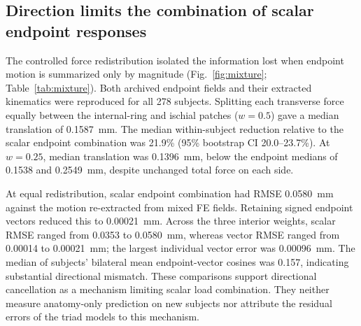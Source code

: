 \subsection{Direction limits the combination of scalar endpoint responses}
The controlled force redistribution isolated the information lost when endpoint motion is summarized only by magnitude (Fig.~\ref{fig:mixture}; Table~\ref{tab:mixture}). Both archived endpoint fields and their extracted kinematics were reproduced for all 278 subjects. Splitting each transverse force equally between the internal-ring and ischial patches ($w=0.5$) gave a median translation of 0.1587~mm. The median within-subject reduction relative to the scalar endpoint combination was 21.9\% (95\% bootstrap CI 20.0--23.7\%). At $w=0.25$, median translation was 0.1396~mm, below the endpoint medians of 0.1538 and 0.2549~mm, despite unchanged total force on each side.

At equal redistribution, scalar endpoint combination had RMSE 0.0580~mm against the motion re-extracted from mixed FE fields. Retaining signed endpoint vectors reduced this to 0.00021~mm. Across the three interior weights, scalar RMSE ranged from 0.0353 to 0.0580~mm, whereas vector RMSE ranged from 0.00014 to 0.00021~mm; the largest individual vector error was 0.00096~mm. The median of subjects' bilateral mean endpoint-vector cosines was 0.157, indicating substantial directional mismatch. These comparisons support directional cancellation as a mechanism limiting scalar load combination. They neither measure anatomy-only prediction on new subjects nor attribute the residual errors of the triad models to this mechanism.

\begin{table}[htbp]
\centering
\caption{Controlled transverse force redistribution. Translation is the cohort median after re-extraction from mixed fields. Directional reduction is the median within-subject percentage reduction relative to scalar endpoint combination; intervals are pointwise subject-bootstrap intervals. Scalar and vector estimates use individual FE endpoint information. RMSE is against the re-extracted mixed-field endpoint.}
\label{tab:mixture}
\end{table}

